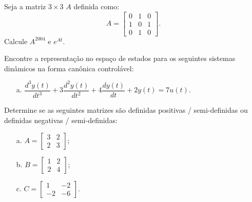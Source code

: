 \begin{resolution}

\end{resolution}

\begin{question}
  Seja a matriz $3 \times 3$ $A$ definida como:
  \[
    A =
    \begin{bmatrix}
      0 & 1 & 0 \\
      1 & 0 & 1 \\
      0 & 1 & 0
    \end{bmatrix}.
  \]
  Calcule $A^{2004}$ e $e^{At}$.
\end{question}

\begin{resolution}

\end{resolution}

\begin{question}
  Encontre a representação no espaço de estados para os seguintes sistemas dinâmicos na forma canônica controlável:
  \begin{itemize}
    \item[a.] $\dfrac{d^3 y(t)}{dt^3} + 3 \dfrac{d^2 y(t)}{dt^2} + 4 \dfrac{dy(t)}{dt} + 2y(t) = 7u(t)$.
  \end{itemize}
\end{question}

\begin{resolution}

\end{resolution}


\begin{question}
  Determine se as seguintes matrizes são definidas positivas / semi-definidas ou definidas negativas / semi-definidas:
  \begin{multicols}{3}
    \begin{itemize}
      \item[a.] $A = \begin{bmatrix} 3 & 2 \\ 2 & 3 \end{bmatrix}$;
      \item[b.] $B = \begin{bmatrix} 1 & 2 \\ 2 & 4 \end{bmatrix}$;
      \item[c.] $C = \begin{bmatrix} 1 & -2 \\ -2 & -6 \end{bmatrix}$.
    \end{itemize}
  \end{multicols}
  \vspace{8pt}
\end{question}

